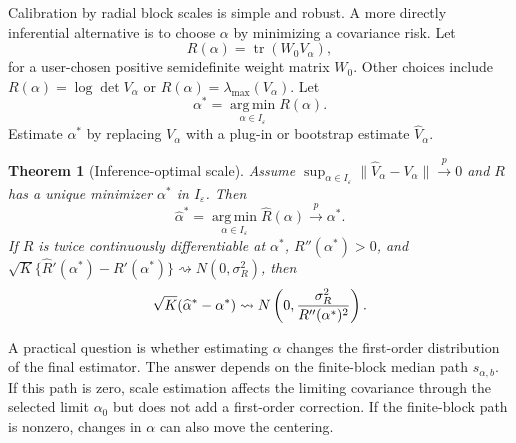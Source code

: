 \documentclass[11pt]{article}
\newtheorem{theorem}{Theorem}
\newcommand{\tr}{\operatorname{tr}}
\newcommand{\argmin}{\operatorname*{arg\,min}}
\newcommand{\dto}{\rightsquigarrow}
\newcommand{\pto}{\stackrel{p}{\to}}
\newcommand{\eps}{\varepsilon}
\begin{document}
Calibration by radial block scales is simple and robust.  A more directly inferential alternative is to choose \(\alpha\) by minimizing a covariance risk.  Let
\begin{equation}\label{eq:risk-alpha}
    R(\alpha)=\tr(W_0V_\alpha),
\end{equation}
for a user-chosen positive semidefinite weight matrix \(W_0\).  Other choices include \(R(\alpha)=\log\det V_\alpha\) or \(R(\alpha)=\lambda_{\max}(V_\alpha)\).  Let
\begin{equation}\label{eq:alpha-star}
    \alpha^*=\argmin_{\alpha\in I_\eps}R(\alpha).
\end{equation}
Estimate \(\alpha^*\) by replacing \(V_\alpha\) with a plug-in or bootstrap estimate \(\widehat V_\alpha\).

\begin{theorem}[Inference-optimal scale]\label{thm:optimal-scale}
Assume \(\sup_{\alpha\in I_\eps}\|\widehat V_\alpha-V_\alpha\|\pto0\) and \(R\) has a unique minimizer \(\alpha^*\) in \(I_\eps\).  Then
\begin{equation}\label{eq:alpha-star-consistency}
    \widehat\alpha^*=\argmin_{\alpha\in I_\eps}\widehat R(\alpha)
    \pto \alpha^*.
\end{equation}
If \(R\) is twice continuously differentiable at \(\alpha^*\), \(R''(\alpha^*)>0\), and \(\sqrt K\{\widehat R'(\alpha^*)-R'(\alpha^*)\}\dto N(0,\sigma_R^2)\), then
\begin{equation}\label{eq:alpha-star-clt}
    \sqrt K(\widehat\alpha^*-\alpha^*)\dto N\left(0,{\sigma_R^2\over R''(\alpha^*)^2}\right).
\end{equation}
\end{theorem}

A practical question is whether estimating \(\alpha\) changes the first-order distribution of the final estimator.  The answer depends on the finite-block median path \(s_{\alpha,b}\).  If this path is zero, scale estimation affects the limiting covariance through the selected limit \(\alpha_0\) but does not add a first-order correction.  If the finite-block path is nonzero, changes in \(\alpha\) can also move the centering.
\end{document}
